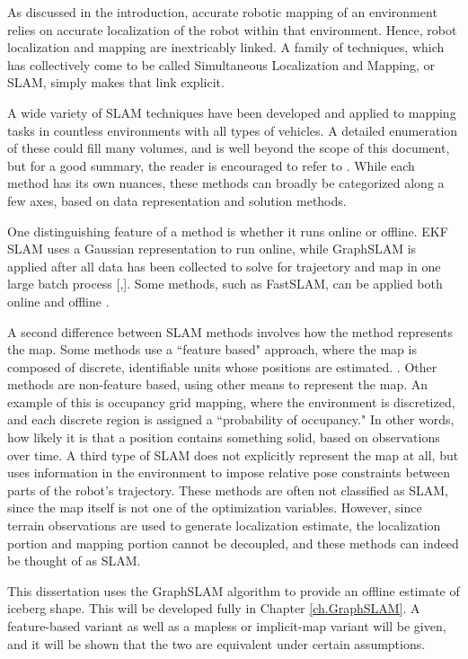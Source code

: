As discussed in the introduction, accurate robotic mapping of an environment relies on accurate localization of the robot within that environment. Hence, robot localization and mapping are inextricably linked. A family of techniques, which has collectively come to be called Simultaneous Localization and Mapping, or SLAM, simply makes that link explicit. 

A wide variety of SLAM techniques have been developed and applied to mapping tasks in countless environments with all types of vehicles. A detailed enumeration of these could fill many volumes, and is well beyond the scope of this document, but for a good summary, the reader is encouraged to refer to \cite{SLAMoverview}. While each method has its own nuances, these methods can broadly be categorized along a few axes, based on data representation and solution methods. 

One distinguishing feature of a method is whether it runs online or offline. EKF SLAM uses a Gaussian representation to run online, while GraphSLAM is applied after all data has been collected to solve for trajectory and map in one large batch process [\cite{},\cite{}]. Some methods, such as FastSLAM, can be applied both online and offline \cite{FastSLAM}.

A second difference between SLAM methods involves how the method represents the map. Some methods use a ``feature based" approach, where the map is composed of discrete, identifiable units whose positions are estimated. \cite{?}. Other methods are non-feature based, using other means to represent the map. An example of this is occupancy grid mapping, where the environment is discretized, and each discrete region is assigned a ``probability of occupancy." In other words, how likely it is that a position contains something solid, based on observations over time.  A third type of SLAM does not explicitly represent the map at all, but uses information in the environment to impose relative pose constraints between parts of the robot's trajectory. These methods are often not classified as SLAM, since the map itself is not one of the optimization variables. However, since terrain observations are used to generate localization estimate,  the localization portion and mapping portion cannot be decoupled, and these methods can indeed be thought of as SLAM. 

This dissertation uses the GraphSLAM algorithm \cite{} to provide an offline estimate of iceberg shape. This will be developed fully in Chapter \ref{ch.GraphSLAM}. A feature-based variant as well as a mapless or implicit-map variant will be given, and it will be shown that the two are equivalent under certain assumptions. 

